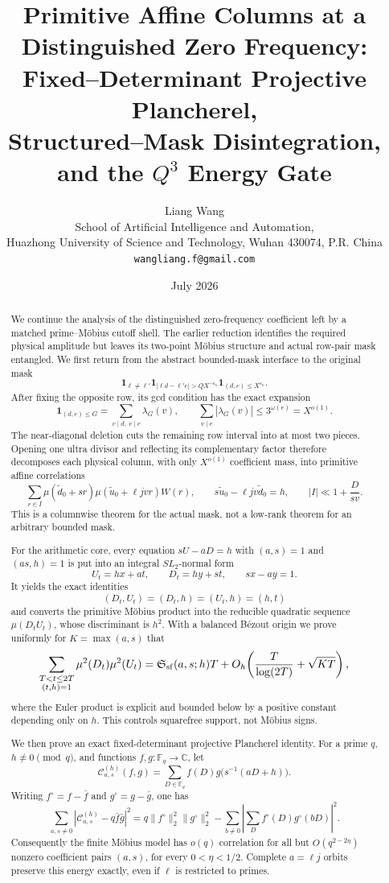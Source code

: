 \documentclass[11pt]{article}
\title{\textbf{Primitive Affine Columns at a Distinguished Zero Frequency:}\\
\textbf{Fixed--Determinant Projective Plancherel,}\\
\textbf{Structured--Mask Disintegration, and the \(Q^3\) Energy Gate}}
\author{Liang Wang\\
\small School of Artificial Intelligence and Automation,\\[-0.2em]
\small Huazhong University of Science and Technology, Wuhan 430074, P.R. China\\
\small \texttt{wangliang.f@gmail.com}}
\date{July 2026}
\theoremstyle{definition}
\theoremstyle{remark}
\newcommand{\C}{\mathbb C}
\newcommand{\F}{\mathbb F}
\newcommand{\one}{\mathbf 1}
\newcommand{\cC}{\mathcal C}
\begin{document}
\maketitle

\begin{abstract}
We continue the analysis of the distinguished zero-frequency coefficient
left by a matched prime--M\"obius cutoff shell.  The earlier reduction
identifies the required physical amplitude but leaves its two-point
M\"obius structure and actual row-pair mask entangled.  We first return
from the abstract bounded-mask interface to the original mask
\[
 \one_{\ell\ne\ell'}
 \one_{|\ell d-\ell'e|>QX^{-\kappa_0}}
 \one_{(d,e)\le X^{\kappa_0}}.
\]
After fixing the opposite row, its gcd condition has the exact expansion
\[
 \one_{(d,e)\le G}
 =\sum_{v\mid d,\ v\mid e}\lambda_G(v),
 \qquad
 \sum_{v\mid e}|\lambda_G(v)|\le3^{\omega(e)}=X^{o(1)}.
\]
The near-diagonal deletion cuts the remaining row interval into at most
two pieces.  Opening one ultra divisor and reflecting its complementary
factor therefore decomposes each physical column, with only
\(X^{o(1)}\) coefficient mass, into primitive affine correlations
\[
 \sum_{r\in I}
 \mu(\widetilde d_0+sr)
 \mu(\widetilde u_0+\ell jv r)W(r),
 \qquad
 s\widetilde u_0-\ell jv\widetilde d_0=h,
 \qquad
 |I|\ll1+\frac{D}{sv}.
\]
This is a columnwise theorem for the actual mask, not a low-rank theorem
for an arbitrary bounded mask.

For the arithmetic core, every equation \(sU-aD=h\) with
\((a,s)=1\) and \((as,h)=1\) is put into an integral
\(SL_2\)-normal form
\[
 U_t=hx+at,\qquad D_t=hy+st,\qquad sx-ay=1.
\]
It yields the exact identities
\[
 (D_t,U_t)=(D_t,h)=(U_t,h)=(h,t)
\]
and converts the primitive M\"obius product into the reducible quadratic
sequence \(\mu(D_tU_t)\), whose discriminant is \(h^2\).  With a balanced
B\'ezout origin we prove uniformly for \(K=\max(a,s)\) that
\[
 \sum_{\substack{T<t\le2T\\(t,h)=1}}
 \mu^2(D_t)\mu^2(U_t)
 =\mathfrak S_{\rm sf}(a,s;h)T
  +O_h\!\left(\frac{T}{\log(2T)}+\sqrt{KT}\right),
\]
where the Euler product is explicit and bounded below by a positive
constant depending only on \(h\).  This controls squarefree support, not
M\"obius signs.

We then prove an exact fixed-determinant projective Plancherel identity.
For a prime \(q\), \(h\ne0\pmod q\), and functions
\(f,g:\F_q\to\C\), let
\[
 \cC_{a,s}^{(h)}(f,g)
 =\sum_{D\in\F_q}f(D)g\bigl(s^{-1}(aD+h)\bigr).
\]
Writing \(f^\circ=f-\bar f\) and \(g^\circ=g-\bar g\), one has
\[
 \sum_{a,s\ne0}
 \left|\cC_{a,s}^{(h)}-q\bar f\bar g\right|^2
 =q\|f^\circ\|_2^2\|g^\circ\|_2^2
 -\sum_{b\ne0}\left|\sum_Df^\circ(D)g^\circ(bD)\right|^2.
\]
Consequently the finite M\"obius model has \(o(q)\) correlation for all
but \(O(q^{2-2\eta})\) nonzero coefficient pairs \((a,s)\), for every
\(0<\eta<1/2\).  Complete \(a=\ell j\) orbits preserve this energy
exactly, even if \(\ell\) is restricted to primes.


\end{abstract}
\end{document}
